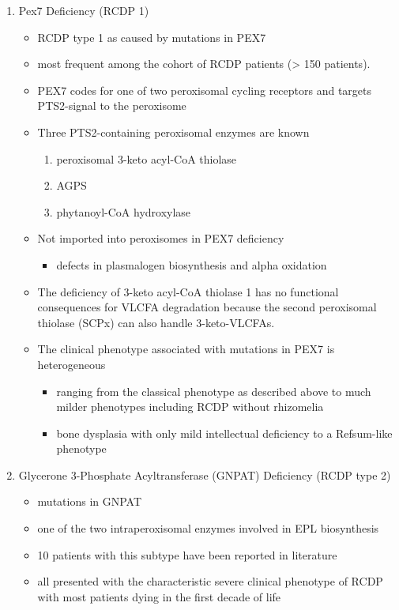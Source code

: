 \documentclass{scrartcl}
\begin{document}
\begin{enumerate}
\item Pex7 Deficiency (RCDP 1)
\label{sec:org87396a7}

\begin{itemize}
\item RCDP type 1 as caused by mutations in PEX7
\item most frequent among the cohort of RCDP patients (> 150 patients).
\item PEX7 codes for one of two peroxisomal cycling receptors and targets PTS2-signal to the peroxisome
\item Three PTS2-containing peroxisomal enzymes are known 
\begin{enumerate}
\item peroxisomal 3-keto acyl-CoA thiolase
\item AGPS
\item phytanoyl-CoA hydroxylase
\end{enumerate}
\item Not imported into peroxisomes in PEX7 deficiency
\begin{itemize}
\item defects in plasmalogen biosynthesis and alpha oxidation
\end{itemize}
\item The deficiency of 3-keto acyl-CoA thiolase 1 has no functional
consequences for VLCFA degradation because the second peroxisomal
thiolase (SCPx) can also handle 3-keto-VLCFAs.

\item The clinical phenotype associated with mutations in PEX7 is heterogeneous
\begin{itemize}
\item ranging from the classical phenotype as described above to much milder phenotypes including RCDP without rhizomelia
\item bone dysplasia with only mild intellectual deficiency to a Refsum-like phenotype
\end{itemize}
\end{itemize}

\item Glycerone 3-Phosphate Acyltransferase (GNPAT) Deficiency (RCDP type 2)
\label{sec:org3516bd0}
\begin{itemize}
\item mutations in GNPAT
\item one of the two intraperoxisomal enzymes involved in EPL biosynthesis
\item 10 patients with this subtype have been reported in literature
\item all presented with the characteristic severe clinical phenotype of
RCDP with most patients dying in the first decade of life
\end{itemize}


\end{enumerate}
\end{document}
